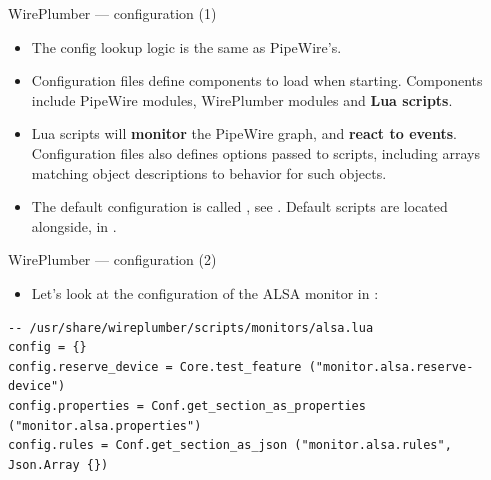\begin{frame}{WirePlumber — configuration (1)}
  \begin{itemize}


  \item The config lookup logic is the same as PipeWire's.

  \item Configuration files define components to load when starting. Components
    include PipeWire modules, WirePlumber modules and \textbf{Lua scripts}.

  \item Lua scripts will \textbf{monitor} the PipeWire graph, and
    \textbf{react to events}. Configuration files also defines options passed
    to scripts, including arrays matching object descriptions to behavior for
    such objects.

  \item The default configuration is called , see
    . Default scripts are located
    alongside, in .

  \end{itemize}
\end{frame}



\begin{frame}[fragile]{WirePlumber — configuration (2)}
  \begin{itemize}
  \item Let's look at the configuration of the ALSA monitor
    in :
  \end{itemize}

    \begin{block}{}
      \fontsize{10}{10}\selectfont
        \begin{verbatim}
-- /usr/share/wireplumber/scripts/monitors/alsa.lua
config = {}
config.reserve_device = Core.test_feature ("monitor.alsa.reserve-device")
config.properties = Conf.get_section_as_properties ("monitor.alsa.properties")
config.rules = Conf.get_section_as_json ("monitor.alsa.rules", Json.Array {})
          \end{verbatim}
        \end{block}
\end{frame}



